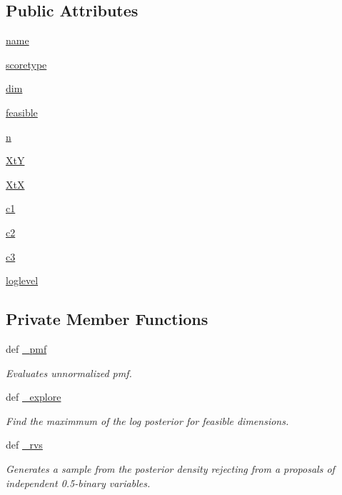 \subsection*{Public Attributes}
\begin{CompactItemize}
\item 
\hyperlink{classgen_1_1binary__post_7f257df286a4acedfc26064cb3db0661}{name}
\item 
\hyperlink{classgen_1_1binary__post_c4a4e7585d9ec429e5a8ad9998d15ba7}{scoretype}
\item 
\hyperlink{classgen_1_1binary__post_f6b86842ca928b27461adcb6f3800cf6}{dim}
\item 
\hyperlink{classgen_1_1binary__post_07f91fffaa967ad5191151bf512f073f}{feasible}
\item 
\hyperlink{classgen_1_1binary__post_28e8dd27262ae15d0151c4ab614c5807}{n}
\item 
\hyperlink{classgen_1_1binary__post_5569d4727af98880ab6efd2baecc943f}{XtY}
\item 
\hyperlink{classgen_1_1binary__post_0ba4dc90f0854325754b5002f9d1f3f6}{XtX}
\item 
\hyperlink{classgen_1_1binary__post_419c9831e2edd73f7eea540fc4ac1839}{c1}
\item 
\hyperlink{classgen_1_1binary__post_11f0ba4507df919b0b30d9644c22f475}{c2}
\item 
\hyperlink{classgen_1_1binary__post_cafd9471ff9337bbb8b2ad9f4b822963}{c3}
\item 
\hyperlink{classgen_1_1binary__post_1f3e1139fe6a08a79f7f223705f7e207}{loglevel}
\end{CompactItemize}
\subsection*{Private Member Functions}
\begin{CompactItemize}
\item 
def \hyperlink{classgen_1_1binary__post_a599045ffd56b46eced7ebae979781ff}{\_\-pmf}
\begin{CompactList}\small\item\em Evaluates unnormalized pmf. \item\end{CompactList}\item 
def \hyperlink{classgen_1_1binary__post_fbfecb84772369428033234930e079a8}{\_\-explore}
\begin{CompactList}\small\item\em Find the maximmum of the log posterior for feasible dimensions. \item\end{CompactList}\item 
def \hyperlink{classgen_1_1binary__post_bc265fbdb0840423716d8a4904469ac8}{\_\-rvs}
\begin{CompactList}\small\item\em Generates a sample from the posterior density rejecting from a proposals of independent 0.5-binary variables. \item\end{CompactList}\end{CompactItemize}


